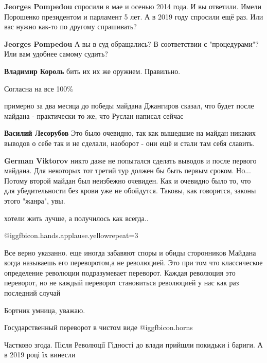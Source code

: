 \begin{itemize}
\begin{itemize}
\textbf{Jeorges Pompedou} спросили в мае и осенью 2014 года. И вы ответили. Имели Порошенко президентом и парламент 5 лет. А в 2019 году спросили ещё раз. Или вас нужно как-то по другому спрашивать?

\textbf{Jeorges Pompedou} А вы в суд обращались? В соответствии с "процедурами"? Или вам удобнее самому судить?

\textbf{Владимир Король} бить их их же оружием. Правильно.

\end{itemize} %

Согласна на все 100\%


примерно за два месяца до победы майдана Джангиров сказал, что будет после
майдана - практически то же, что Руслан написал сейчас

\begin{itemize} %
\textbf{Василий Лесорубов} Это было очевидно, так как вышедшие на майдан никаких выводов о себе так и не сделали, наоборот - они ещё и стали там себя славить.

\textbf{German Viktorov} никто даже не попытался сделать выводов и после первого майдана. Для некоторых тот третий тур должен бы быть первым сроком. Но... Потому второй майдан был неизбежно очевиден. Как и очевидно было то, что для убедительности без крови уже не обойдутся. Таковы, как говорится, законы этого "жанра", увы.
\end{itemize} %

хотели жить лучше, а получилось как всегда..

 @igg{fbicon.hands.applause.yellow}{repeat=3} 

Все верно указанно. еще иногда забавяют споры и обиды сторонников Майдана когда
называешь его переворотом,а не революцией. Это при том что классическое
определение революции подразумевает переворот. Каждая революция это переворот,
но не каждый переворот становиться революцией у нас как раз последний случай

Бортник умница, уважаю.

Государственный переворот в чистом виде @igg{fbicon.horns} 

Частково згода. Після Революції Гідності до влади прийшли покидьки і бариги. А в 2019 році їх винесли


\end{itemize}
